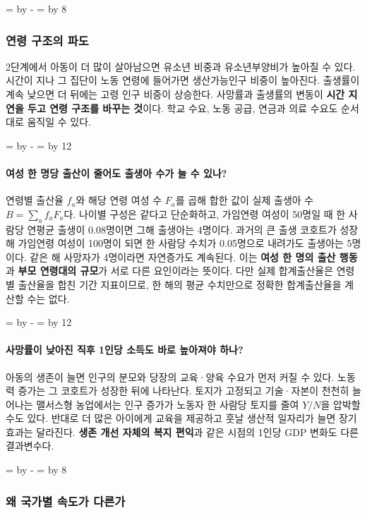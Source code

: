 \documentclass[10pt,a4paper]{article}
\newcommand{\ReserveQuestionSpace}{%
  \par\begingroup
  \dimen0=\pagegoal \advance\dimen0 by -\pagetotal
  \dimen2=\baselineskip \multiply\dimen2 by 12
  \ifdim\dimen0<\dimen2 \newpage\fi
  \endgroup}
\newcommand{\ReserveReadingSectionSpace}{%
  \par\begingroup
  \dimen0=\pagegoal \advance\dimen0 by -\pagetotal
  \dimen2=\baselineskip \multiply\dimen2 by 8
  \ifdim\dimen0<\dimen2 \newpage\fi
  \endgroup}
\begin{document}
\ReserveReadingSectionSpace
\subsubsection*{연령 구조의 파도}

2단계에서 아동이 더 많이 살아남으면 유소년 비중과 유소년부양비가 높아질 수 있다. 시간이 지나 그 집단이 노동 연령에 들어가면 생산가능인구 비중이 높아진다. 출생률이 계속 낮으면 더 뒤에는 고령 인구 비중이 상승한다. 사망률과 출생률의 변동이 \textbf{시간 지연을 두고 연령 구조를 바꾸는 것}이다. 학교 수요, 노동 공급, 연금과 의료 수요도 순서대로 움직일 수 있다.\par

\ReserveQuestionSpace
\paragraph{여성 한 명당 출산이 줄어도 출생아 수가 늘 수 있나?}
연령별 출산율 $f_a$와 해당 연령 여성 수 $F_a$를 곱해 합한 값이 실제 출생아 수 $B=\sum_a f_aF_a$다. 나이별 구성은 같다고 단순화하고, 가임연령 여성이 50명일 때 한 사람당 연평균 출생이 0.08명이면 그해 출생아는 4명이다. 과거의 큰 출생 코호트가 성장해 가임연령 여성이 100명이 되면 한 사람당 수치가 0.05명으로 내려가도 출생아는 5명이다. 같은 해 사망자가 4명이라면 자연증가도 계속된다. 이는 \textbf{여성 한 명의 출산 행동}과 \textbf{부모 연령대의 규모}가 서로 다른 요인이라는 뜻이다. 다만 실제 합계출산율은 연령별 출산율을 합친 기간 지표이므로, 한 해의 평균 수치만으로 정확한 합계출산율을 계산할 수는 없다.\par

\ReserveQuestionSpace
\paragraph{사망률이 낮아진 직후 1인당 소득도 바로 높아져야 하나?}
아동의 생존이 늘면 인구의 분모와 당장의 교육·양육 수요가 먼저 커질 수 있다. 노동력 증가는 그 코호트가 성장한 뒤에 나타난다. 토지가 고정되고 기술·자본이 천천히 늘어나는 맬서스형 농업에서는 인구 증가가 노동자 한 사람당 토지를 줄여 $Y/N$을 압박할 수도 있다. 반대로 더 많은 아이에게 교육을 제공하고 훗날 생산적 일자리가 늘면 장기 효과는 달라진다. \textbf{생존 개선 자체의 복지 편익}과 같은 시점의 1인당 GDP 변화도 다른 결과변수다.\par

\ReserveReadingSectionSpace
\subsubsection*{왜 국가별 속도가 다른가}
\end{document}
